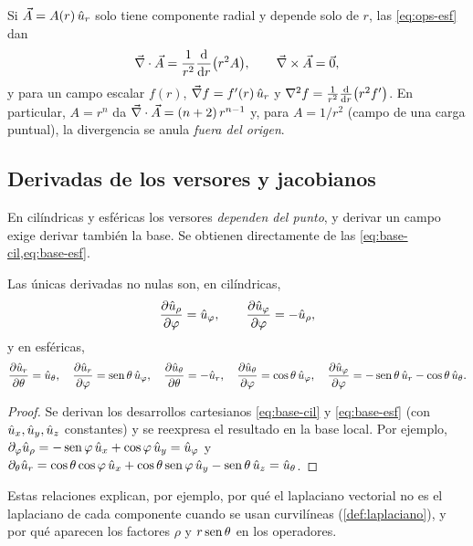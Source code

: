 \begin{ejemplo}\label{ej:simetria-esferica}
Si $\vec{A}=A(r)\,\hat{u}_{r}$ solo tiene componente radial y depende solo de $r$, las
\cref{eq:ops-esf} dan
\[
  \vec{\nabla}\cdot\vec{A}=\frac{1}{r^{2}}\frac{\mathrm{d}}{\mathrm{d} r}\bigl(r^{2}A\bigr),
  \qquad\vec{\nabla}\times\vec{A}=\vec{0},
\]
y para un campo escalar $f(r)$, $\vec{\nabla} f=f'(r)\,\hat{u}_{r}$ y
$\nabla^{2} f=\frac{1}{r^{2}}\frac{\mathrm{d}}{\mathrm{d} r}\bigl(r^{2}f'\bigr)$. En particular,
$A=r^{n}$ da $\vec{\nabla}\cdot\vec{A}=(n+2)\,r^{n-1}$ y, para $A=1/r^{2}$ (campo de una
carga puntual), la divergencia se anula \emph{fuera del origen}.
\end{ejemplo}

\subsection{Derivadas de los versores y jacobianos}\label{sec:versores-jacobianos}
En cilíndricas y esféricas los versores \emph{dependen del punto}, y derivar un
campo exige derivar también la base. Se obtienen directamente de
las \cref{eq:base-cil,eq:base-esf}.

\begin{lema}\label{lema:derivadas-versores}
Las únicas derivadas no nulas son, en cilíndricas,
\[
  \frac{\partial \hat{u}_{\rho}}{\partial \varphi}=\hat{u}_{\varphi},\qquad\frac{\partial \hat{u}_{\varphi}}{\partial \varphi}=-\hat{u}_{\rho},
\]
y en esféricas,
\[
  \frac{\partial \hat{u}_{r}}{\partial \theta}=\hat{u}_{\theta},\quad\frac{\partial \hat{u}_{r}}{\partial \varphi}=\operatorname{sen}\theta\,\hat{u}_{\varphi},\quad
  \frac{\partial \hat{u}_{\theta}}{\partial \theta}=-\hat{u}_{r},\quad\frac{\partial \hat{u}_{\theta}}{\partial \varphi}=\cos\theta\,\hat{u}_{\varphi},\quad
  \frac{\partial \hat{u}_{\varphi}}{\partial \varphi}=-\operatorname{sen}\theta\,\hat{u}_{r}-\cos\theta\,\hat{u}_{\theta} .
\]
\end{lema}
\begin{proof}
Se derivan los desarrollos cartesianos \eqref{eq:base-cil} y \eqref{eq:base-esf} (con
$\hat{u}_{x},\hat{u}_{y},\hat{u}_{z}$ constantes) y se reexpresa el resultado en la base local. Por
ejemplo, $\partial_\varphi\hat{u}_{\rho}=-\operatorname{sen}\varphi\,\hat{u}_{x}+\cos\varphi\,\hat{u}_{y}=\hat{u}_{\varphi}$ y
$\partial_\theta\hat{u}_{r}=\cos\theta\cos\varphi\,\hat{u}_{x}+\cos\theta\operatorname{sen}\varphi\,\hat{u}_{y}-\operatorname{sen}\theta\,\hat{u}_{z}=\hat{u}_{\theta}$.
\end{proof}

Estas relaciones explican, por ejemplo, por qué el laplaciano vectorial no es
el laplaciano de cada componente cuando se usan curvilíneas
(\cref{def:laplaciano}), y por qué aparecen los factores $\rho$ y $r\operatorname{sen}\theta$
en los operadores.

